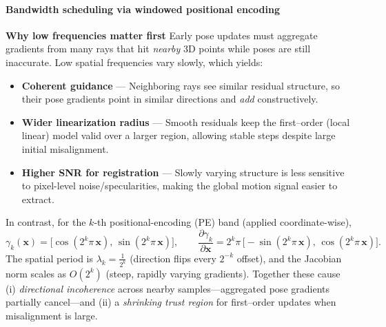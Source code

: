 \begin{enrichment}
\begin{enrichment}
        \paragraph{Bandwidth scheduling via windowed positional encoding}
        \textbf{Why low frequencies matter first} \;
        Early pose updates must aggregate gradients from many rays that hit \emph{nearby} 3D points while poses are still inaccurate. Low spatial frequencies vary slowly, which yields:
        \begin{itemize}
            \item \textbf{Coherent guidance} — Neighboring rays see similar residual structure, so their pose gradients point in similar directions and \emph{add} constructively.
            \item \textbf{Wider linearization radius} — Smooth residuals keep the first–order (local linear) model valid over a larger region, allowing stable steps despite large initial misalignment.
            \item \textbf{Higher SNR for registration} — Slowly varying structure is less sensitive to pixel-level noise/specularities, making the global motion signal easier to extract.
        \end{itemize}
        In contrast, for the $k$-th positional-encoding (PE) band (applied coordinate-wise),
        \[
        \gamma_k(\mathbf{x})=\big[\cos(2^k\pi\,\mathbf{x}),\,\sin(2^k\pi\,\mathbf{x})\big],\qquad
        \frac{\partial \gamma_k}{\partial \mathbf{x}}=2^k\pi\,\big[-\sin(2^k\pi\,\mathbf{x}),\,\cos(2^k\pi\,\mathbf{x})\big].
        \]
        The spatial period is $\lambda_k = \tfrac{1}{2^k}$ (direction flips every $2^{-k}$ offset), 
        and the Jacobian norm scales as $O(2^k)$ (steep, rapidly varying gradients). 
        Together these cause (i) \emph{directional incoherence} across nearby samples—aggregated pose gradients partially cancel—and 
        (ii) a \emph{shrinking trust region} for first–order updates when misalignment is large.
        

\end{enrichment}
\end{enrichment}
